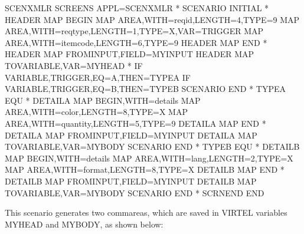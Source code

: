 \documentclass[letterpaper,10pt,english]{sphinxmanual}
\begin{document}
\begin{sphinxVerbatim}[commandchars=\\\{\}]
SCENXMLR    SCREENS APPL=SCENXMLR
*
            SCENARIO INITIAL
*
HEADER      MAP\PYGZdl{} BEGIN
            MAP\PYGZdl{} AREA,WITH=\PYGZsq{}reqid\PYGZsq{},LENGTH=4,TYPE=9
            MAP\PYGZdl{} AREA,WITH=\PYGZsq{}reqtype\PYGZsq{},LENGTH=1,TYPE=X,VAR=\PYGZsq{}TRIGGER\PYGZsq{}
            MAP\PYGZdl{} AREA,WITH=\PYGZsq{}itemcode\PYGZsq{},LENGTH=6,TYPE=9
HEADER      MAP\PYGZdl{} END
*
HEADER      MAP\PYGZdl{} FROM\PYGZhy{}INPUT,FIELD=\PYGZsq{}MYINPUT\PYGZsq{}
HEADER      MAP\PYGZdl{} TO\PYGZhy{}VARIABLE,VAR=\PYGZsq{}MYHEAD\PYGZsq{}
*
            IF\PYGZdl{} VARIABLE,\PYGZsq{}TRIGGER\PYGZsq{},EQ=\PYGZsq{}A\PYGZsq{},THEN=TYPEA
            IF\PYGZdl{} VARIABLE,\PYGZsq{}TRIGGER\PYGZsq{},EQ=\PYGZsq{}B\PYGZsq{},THEN=TYPEB
            SCENARIO END
*
TYPEA       EQU *
DETAILA     MAP\PYGZdl{} BEGIN,WITH=\PYGZsq{}details\PYGZsq{}
            MAP\PYGZdl{} AREA,WITH=\PYGZsq{}color\PYGZsq{},LENGTH=8,TYPE=X
            MAP\PYGZdl{} AREA,WITH=\PYGZsq{}quantity\PYGZsq{},LENGTH=5,TYPE=9
DETAILA     MAP\PYGZdl{} END
*
DETAILA     MAP\PYGZdl{} FROM\PYGZhy{}INPUT,FIELD=\PYGZsq{}MYINPUT\PYGZsq{}
DETAILA     MAP\PYGZdl{} TO\PYGZhy{}VARIABLE,VAR=\PYGZsq{}MYBODY\PYGZsq{}
            SCENARIO END
*
TYPEB       EQU *
DETAILB     MAP\PYGZdl{} BEGIN,WITH=\PYGZsq{}details\PYGZsq{}
            MAP\PYGZdl{} AREA,WITH=\PYGZsq{}lang\PYGZsq{},LENGTH=2,TYPE=X
            MAP\PYGZdl{} AREA,WITH=\PYGZsq{}format\PYGZsq{},LENGTH=8,TYPE=X
DETAILB     MAP\PYGZdl{} END
*
DETAILB     MAP\PYGZdl{} FROM\PYGZhy{}INPUT,FIELD=\PYGZsq{}MYINPUT\PYGZsq{}
DETAILB     MAP\PYGZdl{} TO\PYGZhy{}VARIABLE,VAR=\PYGZsq{}MYBODY\PYGZsq{}
            SCENARIO END
*
            SCRNEND
END
\end{sphinxVerbatim}


This scenario generates two commareas, which are saved in VIRTEL variables MYHEAD and MYBODY, as shown below:
\end{document}
